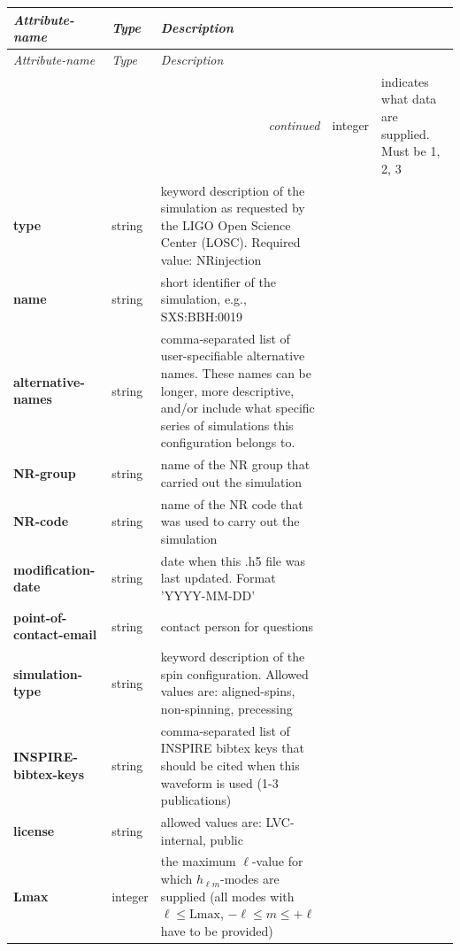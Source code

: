 \documentclass[11pt,tightenlines,article,amssymb,amsmath,amsfonts,superscriptaddress,nofootinbib]{revtex4}
\begin{document}
\renewcommand*{\arraystretch}{1.5} %
\begin{longtable}{|p{3.4cm}|p{1.6cm}|p{11.2cm}|}
  \hline  \emph{Attribute-name} & \emph{Type} & \emph{Description} \\ \hline
  \endhead
  \hline  \emph{Attribute-name} & \emph{Type} & \emph{Description} \\ \hline
\endfirsthead
\hline 
 \multicolumn{3}{r}{\emph{continued}}
\endfoot
\hline
\endlastfoot
  \textbf{Format} & integer & indicates what data are supplied. Must be 1, 2, 3\\
  \textbf{type} & string & keyword description of the simulation as requested by the LIGO Open Science Center (LOSC). Required value: NRinjection\\
  \textbf{name} & string  & short identifier of the simulation, e.g., SXS:BBH:0019\\


\textbf{alternative-names} & string & comma-separated list of user-specifiable alternative names. These names can be longer, more descriptive, and/or include what specific series of simulations this configuration belongs to.\\

\textbf{NR-group} & string &  name of the NR group that carried out the simulation\\

\textbf{NR-code} & string &  name of the NR code that was used to carry out the simulation\\

\textbf{modification-date} & string & date when this .h5 file was last updated. Format 'YYYY-MM-DD'\\

\textbf{point-of-contact-email} & string & contact person for questions\\

\textbf{simulation-type} & string & keyword description of the spin configuration. Allowed values are: aligned-spins, non-spinning, precessing\\

\textbf{INSPIRE-bibtex-keys} & string & comma-separated list of INSPIRE bibtex keys that should be cited when this waveform is used (1-3 publications)\\

\textbf{license} & string & allowed values are: LVC-internal, public\\

\textbf{Lmax} & integer & the maximum $\ell$-value for which  $h_{\ell m}$-modes are supplied (all modes with $\ell \leq \mathrm{Lmax}$, $-\ell \leq m \leq +\ell$ have to be provided)\\


\end{longtable}
\end{document}
